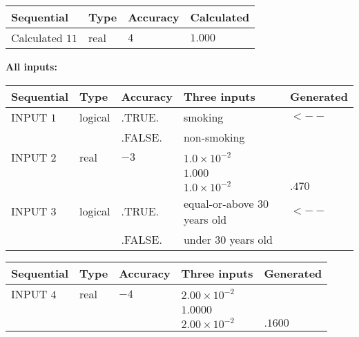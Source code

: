 \documentclass[12pt]{article}
\begin{document}
   
  
  
\noindent\begin{tabular}{|l|l|l|l|}
\hline
 Sequential & Type & Accuracy & Calculated \\ 
\hline
 
 
  Calculated $          11$ & real & $           4 $ & 
 $ 1.000 $ 
 \\  \hline  
 \end{tabular}
   
   
   
   
\noindent\vspace{0.1in}\hspace{-0.08in} {\textbf{\Large{All inputs: }}}
   
   
  
  
\noindent\begin{tabular}{|l|l|l|l|l|}
\hline
 Sequential & Type & Accuracy & Three inputs & Generated \\ 
\hline
 
 
  INPUT $           1$ & logical & .TRUE. & 
 smoking & 
  $ <-- $ 
  \\
  & & .FALSE. & 
  non-smoking & 
 \\  \hline  
 
 
  INPUT $           2$ & real & $          -3 $ & $
 1.0 \times 10^{-2}
  $ & \\
  & & &  $
 1.000
  $ & \\
  & & &  $
 1.0 \times 10^{-2}
 $ & $ .470 $ 
 \\  \hline  
 
 
  INPUT $           3$ & logical & .TRUE. & 
 equal-or-above 30 years old & 
  $ <-- $ 
  \\
  & & .FALSE. & 
  under 30 years old & 
 \\  \hline  
 \end{tabular}
   
   
  
  
\noindent\begin{tabular}{|l|l|l|l|l|}
\hline
 Sequential & Type & Accuracy & Three inputs & Generated \\ 
\hline
 
 
  INPUT $           4$ & real & $          -4 $ & $
 2.00 \times 10^{-2}
  $ & \\
  & & &  $
 1.0000
  $ & \\
  & & &  $
 2.00 \times 10^{-2}
 $ & $ .1600 $ 
 \\  \hline  
 \end{tabular}
   
\end{document}
